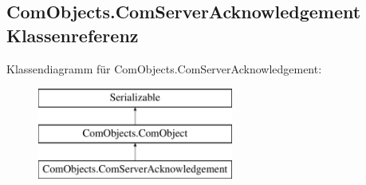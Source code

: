 \hypertarget{a00031}{\subsection{Com\-Objects.\-Com\-Server\-Acknowledgement Klassenreferenz}
\label{a00031}
}
Klassendiagramm für Com\-Objects.\-Com\-Server\-Acknowledgement\-:\begin{figure}[H]
\begin{center}
\leavevmode
\includegraphics[height=3.000000cm]{a00031}
\end{center}
\end{figure}
